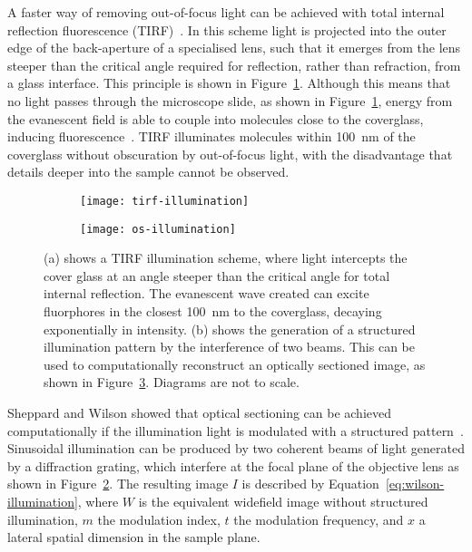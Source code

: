 A faster way of removing out-of-focus light can be achieved with total internal reflection fluorescence (TIRF)~\cite[\textit{ch. 21}]{periasamy2013methods}. 
In this scheme light is projected into the outer edge of the back-aperture of a specialised lens, such that it emerges from the lens steeper than the critical angle required for reflection, rather than refraction, from a glass interface. 
This principle is shown in Figure~\ref{fig:tirf-illumination}. 
Although this means that no light passes through the microscope slide, as shown in Figure~\ref{fig:tirf-illumination}, energy from the evanescent field is able to couple into molecules close to the coverglass, inducing fluorescence~\cite{axelrod1981cell}. 
TIRF illuminates molecules within \SI{100}{\nano\metre} of the coverglass without obscuration by out-of-focus light, with the disadvantage that details deeper into the sample cannot be observed.

\begin{figure}[tbp]
\centering
\begin{subfigure}[b]{0.49\textwidth}
	\texttt{[image: tirf-illumination]}
	\caption{}\label{fig:tirf-illumination}
\end{subfigure}
\hfill
\begin{subfigure}[b]{0.49\textwidth}
	\texttt{[image: os-illumination]}
	\caption{}\label{fig:os-illumination}
\end{subfigure}
\caption[LAG SIM: Both TIRF microscopy and structured illumination patterns can be used to remove out of focus light]{(a) shows a TIRF illumination scheme, where light intercepts the cover glass at an angle steeper than the critical angle for total internal reflection. The evanescent wave created can excite fluorphores in the closest \SI{100}{\nano\metre} to the coverglass, decaying exponentially in intensity. (b) shows the generation of a structured illumination pattern by the interference of two beams. This can be used to computationally reconstruct an optically sectioned image, as shown in Figure~\ref{fig:os-sim-comparison}. Diagrams are not to scale. }
\label{fig:os-sim-comparison}
\end{figure}

Sheppard and Wilson showed that optical sectioning can be achieved computationally if the illumination light is modulated with a structured pattern~\cite{pawley2012handbook, neil1997method}. 
Sinusoidal illumination can be produced by two coherent beams of light generated by a diffraction grating, which interfere at the focal plane of the objective lens as shown in Figure~\ref{fig:os-illumination}. 
The resulting image $I$ is described by Equation~\ref{eq:wilson-illumination}, where $W$ is the equivalent widefield image without structured illumination, $m$ the modulation index, $t$ the modulation frequency, and $x$ a lateral spatial dimension in the sample plane.  


